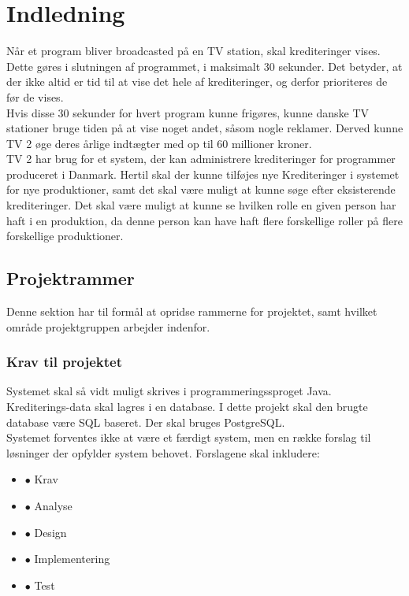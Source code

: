 \section{Indledning}
Når et program bliver broadcasted på en TV station, skal krediteringer vises. Dette gøres i slutningen af programmet, i maksimalt 30 sekunder. Det betyder, at der ikke altid er tid til at vise det hele af krediteringer, og derfor prioriteres de før de vises. \\

\noindent
Hvis disse 30 sekunder for hvert program kunne frigøres, kunne danske TV stationer bruge tiden på at vise noget andet, såsom nogle reklamer. Derved kunne TV 2 øge deres årlige indtægter med op til 60 millioner kroner. \\

\noindent
TV 2 har brug for et system, der kan administrere krediteringer for programmer produceret i Danmark. Hertil skal der kunne tilføjes nye Krediteringer i systemet for nye produktioner, samt det skal være muligt at kunne søge efter eksisterende krediteringer. Det skal være muligt at kunne se hvilken rolle en given person har haft i en produktion, da denne person kan have haft flere forskellige roller på flere forskellige produktioner.

\subsection{Projektrammer}
Denne sektion har til formål at opridse rammerne for projektet, samt hvilket område projektgruppen arbejder indenfor.

\subsubsection{Krav til projektet}
Systemet skal så vidt muligt skrives i programmeringssproget Java. \\
Krediterings-data skal lagres i en database. I dette projekt skal den brugte database være SQL baseret. Der skal bruges PostgreSQL.\\
Systemet forventes ikke at være et færdigt system, men en række forslag til løsninger der opfylder system behovet. Forslagene skal inkludere:

\begin{itemize}
    \item $\bullet$ Krav
    \item $\bullet$ Analyse
    \item $\bullet$ Design
    \item $\bullet$ Implementering
    \item $\bullet$ Test
\end{itemize}

